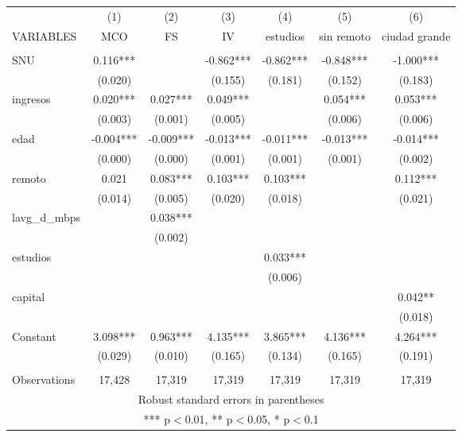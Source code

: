\begin{tabular}{lcccccc} \hline
 & (1) & (2) & (3) & (4) & (5) & (6) \\
VARIABLES & MCO & FS & IV & estudios & sin remoto & ciudad grande \\ \hline
 &  &  &  &  &  &  \\
SNU & 0.116*** &  & -0.862*** & -0.862*** & -0.848*** & -1.000*** \\
 & (0.020) &  & (0.155) & (0.181) & (0.152) & (0.183) \\
ingresos & 0.020*** & 0.027*** & 0.049*** &  & 0.054*** & 0.053*** \\
 & (0.003) & (0.001) & (0.005) &  & (0.006) & (0.006) \\
edad & -0.004*** & -0.009*** & -0.013*** & -0.011*** & -0.013*** & -0.014*** \\
 & (0.000) & (0.000) & (0.001) & (0.001) & (0.001) & (0.002) \\
remoto & 0.021 & 0.083*** & 0.103*** & 0.103*** &  & 0.112*** \\
 & (0.014) & (0.005) & (0.020) & (0.018) &  & (0.021) \\
lavg\_d\_mbps &  & 0.038*** &  &  &  &  \\
 &  & (0.002) &  &  &  &  \\
estudios &  &  &  & 0.033*** &  &  \\
 &  &  &  & (0.006) &  &  \\
capital &  &  &  &  &  & 0.042** \\
 &  &  &  &  &  & (0.018) \\
Constant & 3.098*** & 0.963*** & 4.135*** & 3.865*** & 4.136*** & 4.264*** \\
 & (0.029) & (0.010) & (0.165) & (0.134) & (0.165) & (0.191) \\
 &  &  &  &  &  &  \\
 Observations & 17,428 & 17,319 & 17,319 & 17,319 & 17,319 & 17,319 \\ \hline
\multicolumn{7}{c}{ Robust standard errors in parentheses} \\
\multicolumn{7}{c}{ *** p$<$0.01, ** p$<$0.05, * p$<$0.1} \\
\end{tabular}
